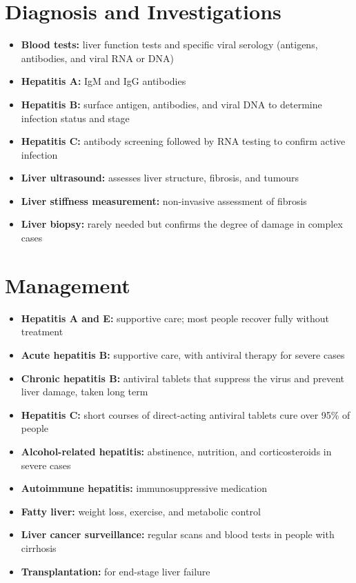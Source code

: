 \section*{Diagnosis and Investigations}
\begin{itemize}
    \item \textbf{Blood tests:} liver function tests and specific viral serology (antigens, antibodies, and viral RNA or DNA)
    \item \textbf{Hepatitis A:} IgM and IgG antibodies
    \item \textbf{Hepatitis B:} surface antigen, antibodies, and viral DNA to determine infection status and stage
    \item \textbf{Hepatitis C:} antibody screening followed by RNA testing to confirm active infection
    \item \textbf{Liver ultrasound:} assesses liver structure, fibrosis, and tumours
    \item \textbf{Liver stiffness measurement:} non-invasive assessment of fibrosis
    \item \textbf{Liver biopsy:} rarely needed but confirms the degree of damage in complex cases
\end{itemize}

\section*{Management}
\begin{itemize}
    \item \textbf{Hepatitis A and E:} supportive care; most people recover fully without treatment
    \item \textbf{Acute hepatitis B:} supportive care, with antiviral therapy for severe cases
    \item \textbf{Chronic hepatitis B:} antiviral tablets that suppress the virus and prevent liver damage, taken long term
    \item \textbf{Hepatitis C:} short courses of direct-acting antiviral tablets cure over 95\% of people
    \item \textbf{Alcohol-related hepatitis:} abstinence, nutrition, and corticosteroids in severe cases
    \item \textbf{Autoimmune hepatitis:} immunosuppressive medication
    \item \textbf{Fatty liver:} weight loss, exercise, and metabolic control
    \item \textbf{Liver cancer surveillance:} regular scans and blood tests in people with cirrhosis
    \item \textbf{Transplantation:} for end-stage liver failure
\end{itemize}

